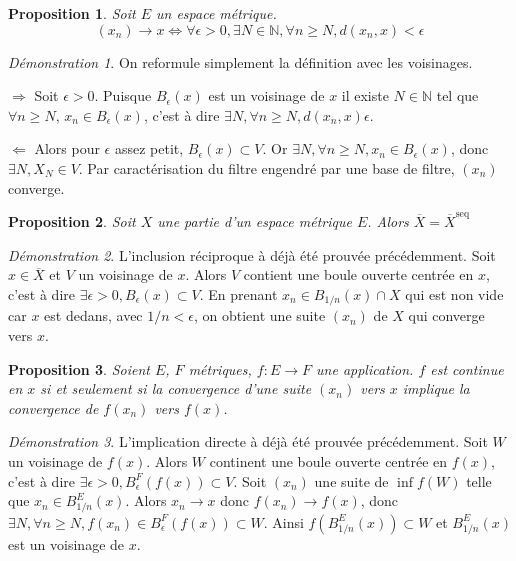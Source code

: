 \documentclass[a4paper, 11pt, french]{book}
\newenvironment{itemise}{\itemize}{\enditemize}
\theoremstyle{plain} %
\newtheorem{proposition}{Proposition}
\theoremstyle{definition} %
\theoremstyle{remark} %
\newtheorem*{demonstration}{Démonstration}
\newcommand{\1}{\mathds{1}}
\newcommand{\N}{\mathbb{N}}
\newcommand\equivalence[3]{
	\begin{demonstration}
		#1
		\begin{itemise}
			\item[$\Longrightarrow$] #2
			\item[$\Longleftarrow$] #3
		\end{itemise}
	\end{demonstration}
}
\begin{document}
\begin{proposition}
	Soit $E$ un espace métrique.
	$$
	(x_n)\longrightarrow x
	\iff
	\forall\epsilon>0, \exists N\in\N, \forall n\geqslant N, d(x_n, x)<\epsilon
	$$
\end{proposition}

\equivalence{
	On reformule simplement la définition avec les voisinages.
}{
	Soit $\epsilon>0$.
	Puisque $B_\epsilon(x)$ est un voisinage de $x$ il existe $N\in\N$ tel que $\forall n\geqslant N$, $x_n\in B_\epsilon(x)$, c'est à dire $\exists N, \forall n\geqslant N, d(x_n, x)\epsilon$.
}{
	Alors pour $\epsilon$ assez petit, $B_\epsilon(x)\subset V$.
	Or $\exists N, \forall n\geqslant N, x_n\in B_\epsilon(x)$, donc $\exists N, X_N\in V$.
	Par caractérisation du filtre engendré par une base de filtre, $(x_n)$ converge.	
}

\begin{proposition}
	Soit $X$ une partie d'un espace métrique $E$.
	Alors $\overline{X}=\overline{X}^\mathrm{seq}$
\end{proposition}

\begin{demonstration}
	L'inclusion réciproque à déjà été prouvée précédemment.
	Soit $x\in\overline{X}$ et $V$ un voisinage de $x$.
	Alors $V$ contient une boule ouverte centrée en $x$, c'est à dire $\exists\epsilon>0, B_\epsilon(x)\subset V$.
	En prenant $x_n\in B_{1/n}(x)\cap X$ qui est non vide car $x$ est dedans, avec $1/n<\epsilon$, on obtient une suite $(x_n)$ de $X$ qui converge vers $x$.
\end{demonstration}

\begin{proposition}
	Soient $E$, $F$ métriques, $f:E\rightarrow F$ une application.
	$f$ est continue en $x$ si et seulement si la convergence d'une suite $(x_n)$ vers $x$ implique la convergence de $f(x_n)$ vers $f(x)$.
\end{proposition}

\begin{demonstration}
	L'implication directe à déjà été prouvée précédemment.
	Soit $W$ un voisinage de $f(x)$.
	Alors $W$ continent une boule ouverte centrée en $f(x)$, c'est à dire $\exists\epsilon>0, B^F_\epsilon(f(x))\subset V$.
	Soit $(x_n)$ une suite de $\inf{f}(W)$ telle que $x_n\in B^E_{1/n}(x)$.
	Alors $x_n\rightarrow x$ donc $f(x_n)\rightarrow f(x)$, donc $\exists N, \forall n\geqslant N, f(x_n)\in B^F_\epsilon(f(x))\subset W$.
	Ainsi $f(B^E_{1/n}(x))\subset W$ et $B^E_{1/n}(x)$ est un voisinage de $x$.
\end{demonstration}
\end{document}

